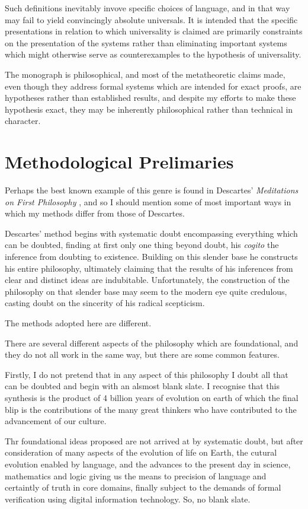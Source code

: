 Such definitions inevitably invove specific choices of language, and in that way may fail to yield convincingly absolute universals.
It is intended that the specific presentations in relation to which universality is claimed are primarily constraints on the presentation of the systems rather than eliminating important systems which might otherwise serve as counterexamples to the hypothesis of universality.

The monograph is philosophical, and most of the metatheoretic claims made, even though they address formal systems which are intended for exact proofs, are hypotheses rather than established results, and despite my efforts to make these hypothesis exact, they may be inherently philosophical rather than technical in character.


\section{Methodological Prelimaries}

Perhaps the best known example of this genre is found in Descartes' \emph{Meditations on First Philosophy} \cite{descartes2013meditations}, and so I should mention some of most important ways in which my methods differ from those of Descartes.

Descartes' method begins with systematic doubt encompassing everything which can be doubted, finding at first only one thing beyond doubt, his \emph{cogito} the inference from doubting to existence.
Building on this slender base he constructs his entire philosophy, ultimately claiming that the results of his inferences from clear and distinct ideas are indubitable.
Unfortunately, the construction of the philosophy on that slender base may seem to the modern eye quite credulous, casting doubt on the sincerity of his radical scepticism.

The methods adopted here are different.

There are several different aspects of the philosophy which are foundational, and they do not all work in the same way, but there are some common features.

Firstly, I do not pretend that in any aspect of this philosophy I doubt all that can be doubted and begin with an alsmost blank slate.
I recognise that this synthesis is the product of 4 billion years of evolution on earth of which the final blip is the contributions of the many great thinkers who have contributed to the advancement of our culture.

Thr foundational ideas proposed are not arrived at by systematic doubt, but after consideration of many aspects of the evolution of life on Earth, the cutural evolution enabled by language, and the advances to the present day in science, mathematics and logic giving us the means to precision of language and certaintly of truth in core domains, finally subject to the demands of formal verification using digital information technology.
So, no blank slate.

